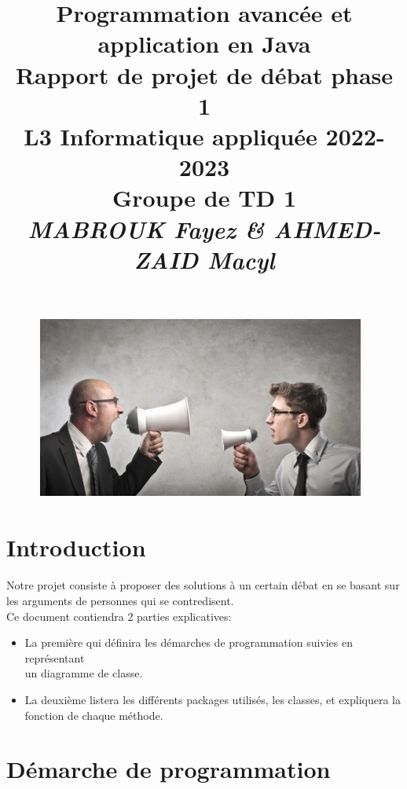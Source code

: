 \documentclass[12pt]{article}
\date{}
\title{{\bf Programmation avancée et application en {\sf Java}} \\
	Rapport de projet de débat phase 1 \\
	{\small L3 Informatique appliquée 2022-2023} \\
			Groupe de TD 1 \\
	{\it \small MABROUK Fayez \& AHMED-ZAID Macyl}}
\begin{document}
	\maketitle
	\begin{figure}[!hbtp]
		\centering
		\includegraphics[scale=1.5]{debat.PNG}
	\end{figure}
	\newpage
	\section{Introduction}
	\paragraph {}
	Notre projet consiste à proposer des solutions à un certain débat en se basant sur les arguments de
	personnes qui se contredisent.\\
	Ce document contiendra 2 parties explicatives: 
	\begin{itemize}
		\item La première qui définira les démarches de programmation suivies en représentant\\ un
		diagramme de classe.
		\item  La deuxième listera les différents packages utilisés, les classes, et expliquera la fonction de
		chaque méthode.
	\end{itemize}
	\section{Démarche de programmation}
\end{document}
